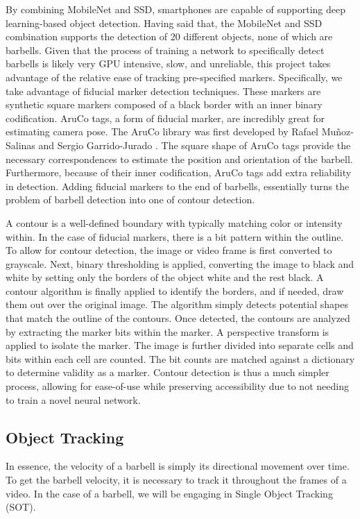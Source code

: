 \documentclass[10pt,twocolumn]{article}
\begin{document}
By combining MobileNet and SSD, smartphones are capable of supporting deep learning-based object detection.
Having said that, the MobileNet and SSD combination supports the detection of 20 different objects, none of which are barbells.
Given that the process of training a network to specifically detect barbells is likely very GPU intensive, slow, and unreliable, this project takes advantage of the relative ease of tracking pre-specified markers.
Specifically, we take advantage of fiducial marker detection techniques.
These markers are synthetic square markers composed of a black border with an inner binary codification.
AruCo tags, a form of fiducial marker, are incredibly great for estimating camera pose.
The AruCo library was first developed by Rafael Muñoz-Salinas and Sergio Garrido-Jurado \cite{Garrido2014}.
The square shape of AruCo tags provide the necessary correspondences to estimate the position and orientation of the barbell.
Furthermore, because of their inner codification, AruCo tags add extra reliability in detection.
Adding fiducial markers to the end of barbells, essentially turns the problem of barbell detection into one of contour detection. \par

A contour is a well-defined boundary with typically matching color or intensity within.
In the case of fiducial markers, there is a bit pattern within the outline.
To allow for contour detection, the image or video frame is first converted to grayscale.
Next, binary thresholding is applied, converting the image to black and white by setting only the borders of the object white and the rest black.
A contour algorithm is finally applied to identify the borders, and if needed, draw them out over the original image.
The algorithm simply detects potential shapes that match the outline of the contours.
Once detected, the contours are analyzed by extracting the marker bits within the marker.
A perspective transform is applied to isolate the marker.
The image is further divided into separate cells and bits within each cell are counted.
The bit counts are matched against a dictionary to determine validity as a marker.
Contour detection is thus a much simpler process, allowing for ease-of-use while preserving accessibility due to not needing to train a novel neural network. \par

\subsection{Object Tracking}
In essence, the velocity of a barbell is simply its directional movement over time.
To get the barbell velocity, it is necessary to track it throughout the frames of a video.
In the case of a barbell, we will be engaging in Single Object Tracking (SOT). \par
\end{document}

